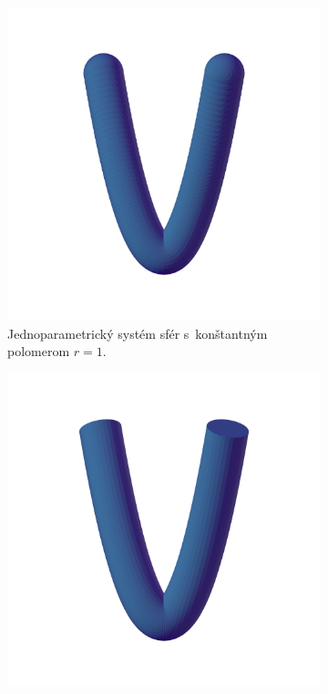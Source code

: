 \documentclass[12pt, twoside]{book}
\begin{document}
\begin{figure}[h]
    \centering
    \captionsetup{justification=centering}
    \captionsetup[subfigure]{justification=centering}
    \begin{subfigure}[t]{0.49\textwidth}
        \centering
        \includegraphics[width=\textwidth, trim=0mm 50mm 0mm 100mm, clip=true]{images/bienert_constant_radius_spheres.png}
        	\caption{Jednoparametrický systém sfér s~konštantným polomerom $r=1$.}
        \label{fig:plocha1}
    \end{subfigure}
    \begin{subfigure}[t]{0.49\textwidth}
        \centering
        \includegraphics[width=\textwidth, trim=0mm 50mm 0mm 100mm, clip=true]{images/bienert_constant_radius_envelope.png}

\end{subfigure}
\end{figure}
\end{document}
